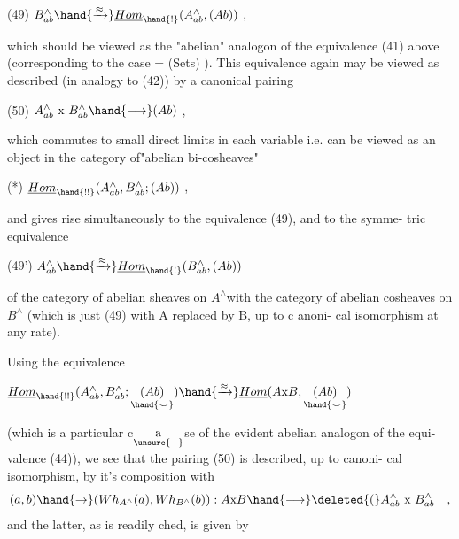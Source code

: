 
(49) \qquad $B^{\wedge}_{ab} \hand{\xrightarrow{\approx}} \underline{Hom}_{\hand{!}}(A^{\wedge}_{ab} , (Ab))$ ,

which should be viewed as the "abelian" analogon of the equivalence (41) 
above (corresponding to the case = (Sets) ). This equivalence again
may be viewed as described (in analogy to (42)) by a canonical pairing

(50) \qquad $A^{\wedge}_{ab} \text{ x } B^{\wedge}_{ab} \hand{\longrightarrow} (Ab)$ ,

which commutes to small direct limits in each variable i.e. can be viewed
as an object in the category of"abelian bi-cosheaves"

(*) \qquad $\underline{Hom}_{\hand{!!}}(A^{\wedge}_{ab},B^{\wedge}_{ab}; (Ab))$ ,

and gives rise simultaneously to the equivalence (49), and to the symme-%
tric equivalence

(49') \qquad $A^{\wedge}_{ab} \hand{\xrightarrow{\approx}} \underline{Hom}_{\hand{!}}(B^{\wedge}_{ab}, (Ab) )$

of the category of abelian sheaves on $A^{\wedge}$with the category of abelian
cosheaves on $B^{\wedge}$ (which is just (49) with A replaced by B, up to c anoni-%
cal isomorphism at any rate).

Using the equivalence

 \qquad $\underline{Hom}_{\hand{!!}}(A^{\wedge}_{ab},B^{\wedge}_{ab} ; \underset{\hand{\smile}}{(Ab)}) \hand{\xrightarrow{\approx}} \underline{Hom}(A\text{x}B, \underset{\hand{\smile}}{(Ab)})$

(which is a particular c\(\underset{\unsure{-}}{\text{a}}\)se of the evident abelian analogon of the equi-%
valence (44)), we see that the pairing (50) is described, up to canoni-%
cal isomorphism, by it's  composition with
\[(a,b)\hand{\rightarrow}(Wh_{A^{\wedge}}(a), Wh_{B^{\wedge}}(b)) : A\text{x}B \hand{\longrightarrow} \deleted{(}A^{\wedge}_{ab} \text{ x } B^{\wedge}_{ab} \quad ,\]
and the latter, as is readily ched, is given by

